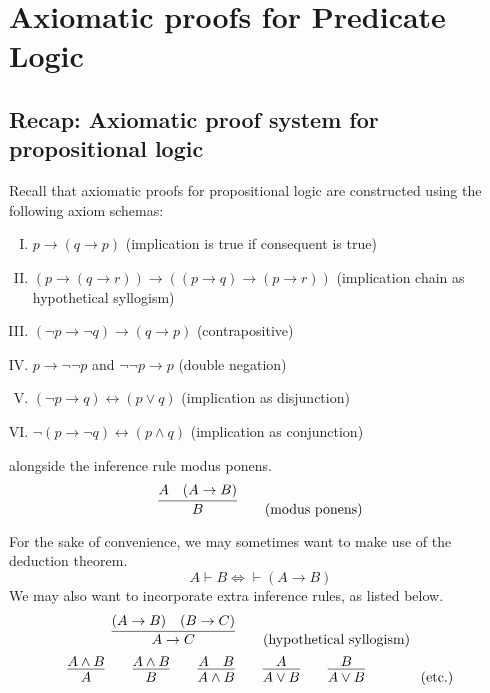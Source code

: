 \section{Axiomatic proofs for Predicate Logic}

\subsection{Recap: Axiomatic proof system for propositional logic}

Recall that axiomatic proofs for propositional logic are constructed using the following axiom schemas:
%
\begin{enumerate}[I.]
    \item \(p \rightarrow (q \rightarrow p)\)
    \hfill (implication is true if consequent is true)
    \label{Ch06-axiom-I}
    
    \item \((p \rightarrow (q \rightarrow r)) \rightarrow ((p \rightarrow q) \rightarrow (p \rightarrow r))\)
    \hfill (implication chain as hypothetical syllogism)
    \label{Ch06-axiom-II}
    
    \item \((\neg p \rightarrow \neg q) \rightarrow (q \rightarrow p)\)
    \hfill (contrapositive)
    \label{Ch06-axiom-III}

    \item \(p \rightarrow \neg\neg p\) and \(\neg\neg p \rightarrow p\)
    \hfill (double negation)
    \label{Ch06-axiom-IV}
    
    \item \((\neg p \rightarrow q) \leftrightarrow (p \lor q)\)
    \hfill (implication as disjunction)
    \label{Ch06-axiom-V}
    
    \item \(\neg(p \rightarrow \neg q) \leftrightarrow (p \land q)\)
    \hfill (implication as conjunction)
    \label{Ch06-axiom-VI}
\end{enumerate}
%
alongside the inference rule modus ponens.
%
\[
    \infer{B}{
        A
        &
        (A\rightarrow B)
    }
    \tag{modus ponens}
\]

For the sake of convenience, we may sometimes want to make use of the deduction theorem.
%
\[A \vdash B \iff \vdash (A \rightarrow B) \tag{deduction theorem}\]
%
We may also want to incorporate extra inference rules, as listed below.
%
\[
    \infer{A \rightarrow C}{(A \rightarrow B) & (B \rightarrow C)}
    \tag{hypothetical syllogism}
\]
%
\[
    \infer{A}{A \land B}
    \hspace{2em}
    \infer{B}{A \land B}
    \hspace{2em}
    \infer{A\land B}{A & B}
    \hspace{2em}
    \infer{A\lor B}{A}
    \hspace{2em}
    \infer{A\lor B}{B}
    \hspace{2em}
    \tag{etc.}
\]



